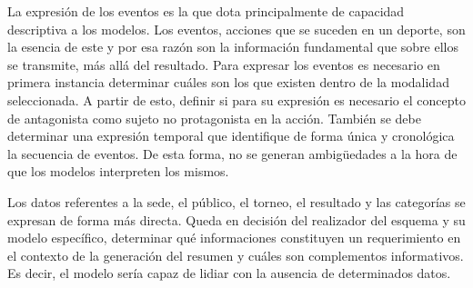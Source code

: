     La expresión de los eventos es la que dota principalmente de capacidad descriptiva a los modelos. Los eventos, acciones que se suceden en un deporte, son la esencia de 
este y por esa razón son la información fundamental que sobre ellos se transmite, más allá del resultado. Para expresar los eventos es necesario en primera instancia determinar cuáles 
son los que existen dentro de la modalidad seleccionada. A partir de esto, definir si para su expresión es necesario el concepto de antagonista como sujeto no protagonista en la acción.
También se debe determinar una expresión temporal que identifique de forma única y cronológica la secuencia de eventos. De esta forma, no se generan ambigüedades a la hora de que los 
modelos interpreten los mismos.

    Los datos referentes a la sede, el público, el torneo, el resultado y las categorías se expresan de forma más directa. Queda en decisión del realizador del esquema y su modelo específico, 
determinar qué informaciones constituyen un requerimiento en el contexto de la generación del resumen y cuáles son complementos informativos. Es decir, el modelo sería capaz de lidiar con 
la ausencia de determinados datos. 



